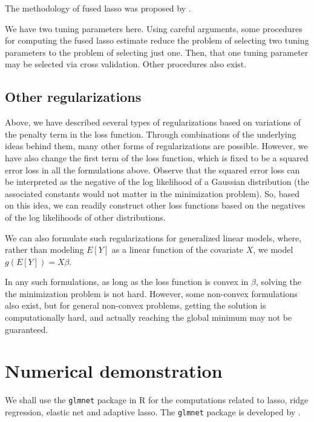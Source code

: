 \documentclass[
]{book}
\begin{document}
The methodology of fused lasso was proposed by \citet{tibshirani2005sparsity}.

We have two tuning parameters here. Using careful arguments, some procedures for computing the fused lasso estimate reduce the problem of selecting two tuning parameters to the problem of selecting just one. Then, that one tuning parameter may be selected via cross validation. Other procedures also exist.

\hypertarget{otherregularizations-description}{%
\subsection{Other regularizations}\label{otherregularizations-description}}

Above, we have described several types of regularizations based on variations of the penalty term in the loss function. Through combinations of the underlying ideas behind them, many other forms of regularizations are possible. However, we have also change the first term of the loss function, which is fixed to be a squared error loss in all the formulations above. Observe that the squared error loss can be interpreted as the negative of the log likelihood of a Gaussian distribution (the associated constants would not matter in the minimization problem). So, based on this idea, we can readily construct other loss functions based on the negatives of the log likelihoods of other distributions.

We can also formulate such regularizations for generalized linear models, where, rather than modeling \(E[Y]\) as a linear function of the covariate \(X\), we model \(g(E[Y]) = X \beta\).

In any such formulations, as long as the loss function is convex in \(\beta\), solving the the minimization problem is not hard. However, some non-convex formulations also exist, but for general non-convex problems, getting the solution is computationally hard, and actually reaching the global minimum may not be guaranteed.

\hypertarget{regularizations-demonstration}{%
\section{Numerical demonstration}\label{regularizations-demonstration}}

We shall use the \texttt{glmnet} package in R for the computations related to lasso, ridge regression, elastic net and adaptive lasso. The \texttt{glmnet} package is developed by \citet{R-glmnet}.
\end{document}
